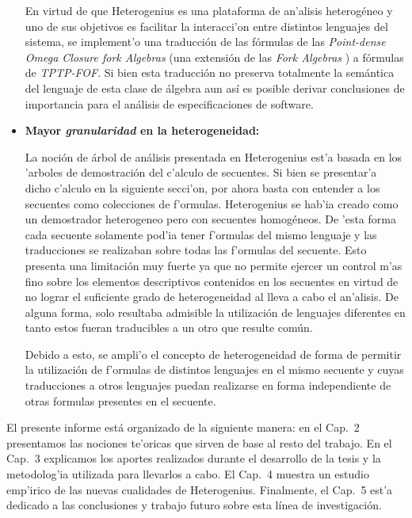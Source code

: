 \begin{itemize}
En virtud de que Heterogenius es una plataforma de an'alisis heterogéneo y uno de sus objetivos es facilitar la interacci'on entre distintos lenguajes del sistema, se implement'o una traducción de las fórmulas de las \emph{Point-dense Omega Closure fork Algebras} \cite{LF06} (una extensión de las \emph{Fork Algebras} \cite{frias02}) a fórmulas de \emph{TPTP-FOF}. Si bien esta traducción no preserva totalmente la semántica del lenguaje de esta clase de álgebra aun así es posible derivar conclusiones de importancia para el análisis de especificaciones de software.


\item \textbf{Mayor \emph{granularidad} en la heterogeneidad:}

La noción de árbol de análisis presentada en Heterogenius est'a basada en los 'arboles de demostración del c'alculo de secuentes.
Si bien se presentar'a dicho c'alculo en la siguiente secci'on, por ahora basta con entender a los secuentes como colecciones de f'ormulas.
Heterogenius se hab'ia creado como un demostrador heterogeneo pero con secuentes homogéneos. 
De 'esta forma cada secuente solamente pod'ia tener f'ormulas del mismo lenguaje y las traducciones se realizaban sobre todas las f'ormulas del secuente. 
Esto presenta una limitación muy fuerte ya que no permite ejercer un control m'as fino sobre los elementos descriptivos contenidos en los secuentes en virtud de no lograr el suficiente grado de heterogeneidad al lleva a cabo el an'alisis.
De alguna forma, solo resultaba admisible la utilización de lenguajes diferentes en tanto estos fueran traducibles a un otro que resulte común.

Debido a esto, se ampli'o el concepto de heterogeneidad de forma de permitir la utilización de f'ormulas de distintos lenguajes en el mismo secuente y cuyas traducciones a otros lenguajes puedan realizarse en forma independiente de otras formulas presentes en el secuente.
\end{itemize}

El presente informe está organizado de la siguiente manera: en el Cap.~2 presentamos las nociones te'oricas que sirven de base al resto del trabajo.
En el Cap.~3 explicamos los aportes realizados durante el desarrollo de la tesis y la metodolog'ia utilizada para llevarlos a cabo. El Cap.~4 muestra un estudio emp'irico de las nuevas cualidades de Heterogenius. Finalmente, el Cap.~5 est'a dedicado a las conclusiones y trabajo futuro sobre esta línea de investigación.

